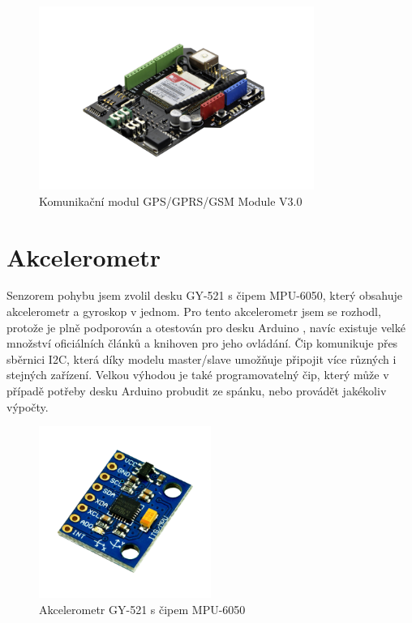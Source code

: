 \documentclass[FM,MP]{tulthesis}  %
\begin{document}
\begin{figure}[H]
\begin{center}
\includegraphics[width=0.8\textwidth]{images/module.png}
\caption{Komunikační modul GPS/GPRS/GSM Module V3.0}
\label{image}
\end{center}
\end{figure}

\section{Akcelerometr}
Senzorem pohybu jsem zvolil desku GY-521 s čipem MPU-6050, který obsahuje akcelerometr a gyroskop v jednom. Pro tento akcelerometr jsem se rozhodl, protože je plně podporován a otestován pro desku Arduino \cite{Arduino acce}, navíc existuje velké množství oficiálních článků a knihoven \cite{I2cdevlib} pro jeho ovládání. Čip komunikuje přes sběrnici I2C, která díky modelu master/slave umožňuje připojit více různých i stejných zařízení. Velkou výhodou je také programovatelný čip, který může v případě potřeby desku Arduino probudit ze spánku, nebo provádět jakékoliv výpočty.

\begin{figure}[H]
\begin{center}
\includegraphics[width=0.5\textwidth]{images/akcelerometr.png}
\caption{Akcelerometr GY-521 s čipem MPU-6050}
\label{image}
\end{center}
\end{figure}
\end{document}
